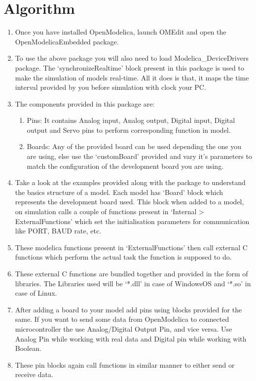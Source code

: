 \documentclass[12pt,a4paper]{report}
\begin{document}
\section{Algorithm}
\begin{enumerate}
\item Once you have installed OpenModelica, launch OMEdit and open the OpenModelicaEmbedded package.
\item To use the above package you will also need to load Modelica\_DeviceDrivers package. The ‘synchronizeRealtime’ block present in this package is used to make the simulation of models real-time. All it does is that, it maps the time interval provided by you before simulation with clock your PC.
\item The components provided in this package are:
\begin{enumerate}
\item Pins: It contains Analog input, Analog output, Digital input, Digital output and Servo pins to perform corresponding function in model.
\item Boards: Any of the provided board can be used depending the one you are using, else use the ‘customBoard’ provided and vary it’s parameters to match the configuration of the development board you are using.
\end{enumerate}
\item Take a look at the examples provided along with the package to understand the basics structure of a model. Each model has ‘Board’ block which represents the development board used. This block when added to a model, on simulation calls a couple of functions present in ‘Internal > ExternalFunctions’ which set the initialisation parameters for communication like PORT, BAUD rate, etc.
\item These modelica functions present in ‘ExternalFunctions’ then call external C functions which perform the actual task the function is supposed to do.
\item These external C functions are bundled together and provided in the form of libraries. The Libraries used will be ‘*.dll’ in case of WindowsOS and ‘*.so’ in case of Linux.
\item After adding a board to your model add pins using blocks provided for the same. If you want to send some data from OpenModelica to connected microcontroller the use Analog/Digital Output Pin, and vice versa. Use Analog Pin while working with real data and Digital pin while working with Boolean.
\item These pin blocks again call functions in similar manner to either send or receive data.

\end{enumerate}
\end{document}

